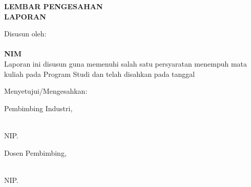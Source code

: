 
\newcommand{\fleksibelnama}[1]{%
    {\footnotesize\parbox{\linewidth}{\centering #1}}%
}

\newcommand{\fleksibelnip}[1]{%
    {\footnotesize NIP. #1}%
}

\newpage
{}
\begin{center}
    \begin{doublespace}
        \textbf{\large \MakeUppercase{lembar pengesahan}}\\
        \textbf{\large \MakeUppercase{Laporan {\tipe}}}
    \end{doublespace}
\end{center}

\begin{center}
    \begin{doublespace}
        \textbf{\large \MakeUppercase {\judulid}}
    \end{doublespace}
\end{center}

\begin{center}
    Disusun oleh:\\
    \textbf{\penulis}\\
    \textbf{NIM \nim}\\[1.5cm]

    Laporan ini disusun guna memenuhi salah satu persyaratan menempuh mata kuliah {\tipe} pada Program Studi {\prodi} {\fakultas} {\universitas} dan telah disahkan pada tanggal \tglpengesahan\\[0.75cm]
\end{center}

\begin{center}
    Menyetujui/Mengesahkan:\\
\end{center}

\begin{minipage}{0.45\textwidth}
    \centering
    Pembimbing Industri,\\[2cm]
    \fleksibelnama{\pembimbingindustri}\\
    \fleksibelnip{\NIKpembimbingindustri}
\end{minipage}
\hfill
\begin{minipage}{0.45\textwidth}
    \centering
    Dosen Pembimbing,\\[2cm]
    \fleksibelnama{\pembimbing}\\
    \fleksibelnip{\NIPpembimbing}
\end{minipage}%

